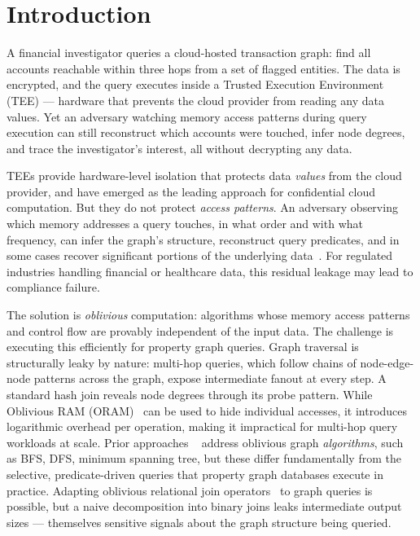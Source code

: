 \section{Introduction}
\label{sec:introduction}

A financial investigator queries a cloud-hosted transaction graph: find all 
accounts reachable within three hops from a set of flagged entities. The data 
is encrypted, and the query executes inside a Trusted Execution Environment 
(TEE) --- hardware that prevents the cloud provider from reading any data 
values. Yet an adversary watching memory access patterns during query execution 
can still reconstruct which accounts were touched, infer node degrees, and 
trace the investigator's interest, all without decrypting any data. 

TEEs provide hardware-level isolation that protects data \emph{values} from the 
cloud provider, and have emerged as the leading approach for confidential cloud 
computation. But they do not protect \emph{access patterns}. An adversary 
observing which memory addresses a query touches, in what order and with what 
frequency, can infer the graph's structure, reconstruct query predicates, and in 
some cases recover significant portions of the underlying 
data~\cite{islam2012access, grubbs2019learning, kellaris2016generic, 
kornaropoulos2019data, cash2015leakage, demertzis2020seal, grubbs2018pump, 
gui2019encrypted, lacharite2018improved, oya2021hiding, poddar2020practical, 
zhang2016all, oya2022ihop}. For regulated industries handling financial or 
healthcare data, this residual leakage may lead to compliance failure.

The solution is \emph{oblivious} computation: algorithms whose memory access 
patterns and control flow are provably independent of the input data. The 
challenge is executing this efficiently for property graph queries. Graph 
traversal is structurally leaky by nature: multi-hop queries, which follow 
chains of node-edge-node patterns across the graph, expose intermediate fanout 
at every step. A standard hash join reveals node degrees through its probe 
pattern. While Oblivious RAM 
(ORAM)~\cite{goldreich1987towards, stefanov2013path} can be used to hide 
individual accesses, it introduces logarithmic overhead per operation, making 
it impractical for multi-hop query workloads at scale. Prior approaches ~\cite{chamani2023graphos, 
feng2025enabling} address oblivious graph \emph{algorithms}, such as BFS, DFS, 
minimum spanning tree, but these differ fundamentally from the selective, 
predicate-driven queries that property graph databases execute in practice. 
Adapting oblivious relational join 
operators~\cite{krastnikov2020efficient, zheng2017opaque, 
eskandarian2019oblidb, arasu2013oblivious, mavrogiannakis2025obliviator, 
reichert2024menhir} to graph queries is possible, but a naive decomposition 
into binary joins leaks intermediate output sizes --- themselves sensitive 
signals about the graph structure being queried.


